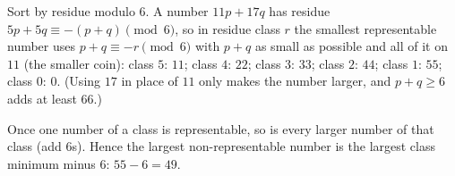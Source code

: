 Sort by residue modulo $6$. A number $11p+17q$ has residue $5p+5q\equiv-(p+q)\pmod6$, so in residue class $r$ the smallest representable number uses $p+q\equiv-r\pmod 6$ with $p+q$ as small as possible and all of it on $11$ (the smaller coin): class $5$: $11$; class $4$: $22$; class $3$: $33$; class $2$: $44$; class $1$: $55$; class $0$: $0$. (Using $17$ in place of $11$ only makes the number larger, and $p+q\ge6$ adds at least $66$.)

Once one number of a class is representable, so is every larger number of that class (add $6$s). Hence the largest non-representable number is the largest class minimum minus $6$: $55-6=\boxed{49}$.

